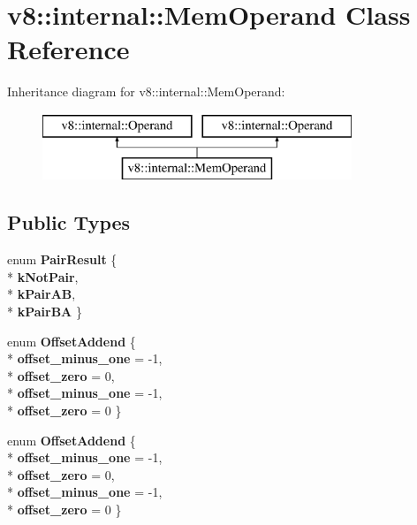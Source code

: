 \hypertarget{classv8_1_1internal_1_1_mem_operand}{}\section{v8\+:\+:internal\+:\+:Mem\+Operand Class Reference}
\label{classv8_1_1internal_1_1_mem_operand}
Inheritance diagram for v8\+:\+:internal\+:\+:Mem\+Operand\+:\begin{figure}[H]
\begin{center}
\leavevmode
\includegraphics[height=2.000000cm]{classv8_1_1internal_1_1_mem_operand}
\end{center}
\end{figure}
\subsection*{Public Types}
\begin{DoxyCompactItemize}
\item 
enum {\bfseries Pair\+Result} \{ \\*
{\bfseries k\+Not\+Pair}, 
\\*
{\bfseries k\+Pair\+AB}, 
\\*
{\bfseries k\+Pair\+BA}
 \}\hypertarget{classv8_1_1internal_1_1_mem_operand_a39c608c01e6307073154d984c757a072}{}\label{classv8_1_1internal_1_1_mem_operand_a39c608c01e6307073154d984c757a072}

\item 
enum {\bfseries Offset\+Addend} \{ \\*
{\bfseries offset\+\_\+minus\+\_\+one} = -\/1, 
\\*
{\bfseries offset\+\_\+zero} = 0, 
\\*
{\bfseries offset\+\_\+minus\+\_\+one} = -\/1, 
\\*
{\bfseries offset\+\_\+zero} = 0
 \}\hypertarget{classv8_1_1internal_1_1_mem_operand_ae497a6efbe9a0c02dd8ba0f2428f1bc8}{}\label{classv8_1_1internal_1_1_mem_operand_ae497a6efbe9a0c02dd8ba0f2428f1bc8}

\item 
enum {\bfseries Offset\+Addend} \{ \\*
{\bfseries offset\+\_\+minus\+\_\+one} = -\/1, 
\\*
{\bfseries offset\+\_\+zero} = 0, 
\\*
{\bfseries offset\+\_\+minus\+\_\+one} = -\/1, 
\\*
{\bfseries offset\+\_\+zero} = 0
 \}\hypertarget{classv8_1_1internal_1_1_mem_operand_ae497a6efbe9a0c02dd8ba0f2428f1bc8}{}\label{classv8_1_1internal_1_1_mem_operand_ae497a6efbe9a0c02dd8ba0f2428f1bc8}

\end{DoxyCompactItemize}
